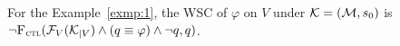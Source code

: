 \documentclass{article}
\begin{document}
%
%

\begin{example}
For the Example~\ref{exmp:1}, the WSC of $\varphi$ on $V$ under ${\cal K} =({\cal M}, s_0)$ is $\neg {\textsc{F}_{\textsc{ctl}}}({\cal F}_{V}({\cal K}_{|V}) \wedge (q \equiv \varphi) \wedge \neg q, q)$.
\end{example}
\end{document}
